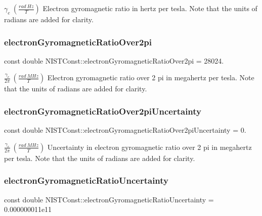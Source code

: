 $\gamma_e \ (\frac{rad\ Hz}{T})$ Electron gyromagnetic ratio in hertz per tesla. Note that the units of radians are added for clarity. \mbox{\label{group___electron_ga67e6ebbd2c2d8043cbdb09979dc7247b}} 
\subsubsection{\texorpdfstring{electron\+Gyromagnetic\+Ratio\+Over2pi}{electronGyromagneticRatioOver2pi}}
{\footnotesize\ttfamily const double N\+I\+S\+T\+Const\+::electron\+Gyromagnetic\+Ratio\+Over2pi = 28024.}

$\frac{\gamma_e}{2\pi} \ (\frac{rad\ MHz}{T})$ Electron gyromagnetic ratio over 2 pi in megahertz per tesla. Note that the units of radians are added for clarity. \mbox{\label{group___electron_ga12a5f7854d899e2c2d637708d0c1b4ec}} 
\subsubsection{\texorpdfstring{electron\+Gyromagnetic\+Ratio\+Over2pi\+Uncertainty}{electronGyromagneticRatioOver2piUncertainty}}
{\footnotesize\ttfamily const double N\+I\+S\+T\+Const\+::electron\+Gyromagnetic\+Ratio\+Over2pi\+Uncertainty = 0.}

$\frac{\gamma_e}{2\pi} \ (\frac{rad\ MHz}{T})$ Uncertainty in electron gyromagnetic ratio over 2 pi in megahertz per tesla. Note that the units of radians are added for clarity. \mbox{\label{group___electron_gaca70ad0d6ddcb9cd3f29880a30415db8}} 
\subsubsection{\texorpdfstring{electron\+Gyromagnetic\+Ratio\+Uncertainty}{electronGyromagneticRatioUncertainty}}
{\footnotesize\ttfamily const double N\+I\+S\+T\+Const\+::electron\+Gyromagnetic\+Ratio\+Uncertainty = 0.\+000000011e11}

